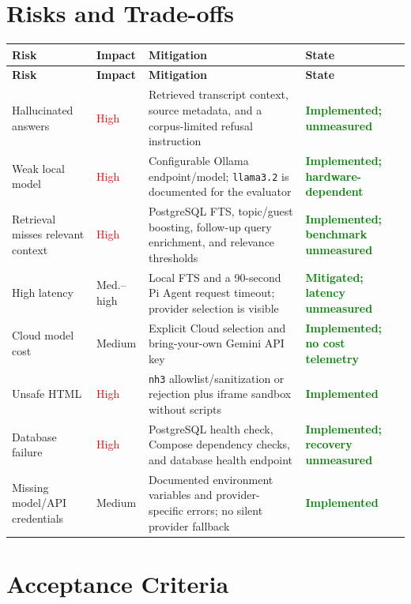 \documentclass[11pt]{article}
\newcommand{\status}[1]{\textcolor{Green}{\textbf{#1}}}
\begin{document}
\section{Risks and Trade-offs}

\small
\begin{longtable}{@{}L{1.60in}L{0.78in}L{3.18in}L{0.72in}@{}}
\toprule
\textbf{Risk} & \textbf{Impact} & \textbf{Mitigation} & \textbf{State} \\
\midrule
\endfirsthead
\toprule
\textbf{Risk} & \textbf{Impact} & \textbf{Mitigation} & \textbf{State} \\
\midrule
\endhead
Hallucinated answers & \textcolor{Red}{High} & Retrieved transcript context, source metadata, and a corpus-limited refusal instruction & \status{Implemented; unmeasured} \\
Weak local model & \textcolor{Red}{High} & Configurable Ollama endpoint/model; \texttt{llama3.2} is documented for the evaluator & \status{Implemented; hardware-dependent} \\
Retrieval misses relevant context & \textcolor{Red}{High} & PostgreSQL FTS, topic/guest boosting, follow-up query enrichment, and relevance thresholds & \status{Implemented; benchmark unmeasured} \\
High latency & \textcolor{Amber}{Med.--high} & Local FTS and a 90-second Pi Agent request timeout; provider selection is visible & \status{Mitigated; latency unmeasured} \\
Cloud model cost & \textcolor{Amber}{Medium} & Explicit Cloud selection and bring-your-own Gemini API key & \status{Implemented; no cost telemetry} \\
Unsafe HTML & \textcolor{Red}{High} & \texttt{nh3} allowlist/sanitization or rejection plus iframe sandbox without scripts & \status{Implemented} \\
Database failure & \textcolor{Red}{High} & PostgreSQL health check, Compose dependency checks, and database health endpoint & \status{Implemented; recovery unmeasured} \\
Missing model/API credentials & \textcolor{Amber}{Medium} & Documented environment variables and provider-specific errors; no silent provider fallback & \status{Implemented} \\
\bottomrule
\end{longtable}
\normalsize

\section{Acceptance Criteria}
\end{document}
